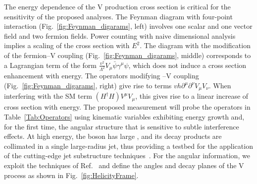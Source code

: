 \documentclass[a4paper,11pt]{article}
\renewcommand{\PV}{{{{V}}}\xspace}
\newcommand{\VH}{{{\PV}{\PH}}\xspace}
\begin{document}
The energy dependence of the \VH production cross section is critical for the sensitivity of the proposed analyses. 
The Feynman diagram with four-point interaction (Fig.~\ref{fig:Feynman_digarams}, left) involves one scalar and one vector field and two fermion fields.
Power counting with naive dimensional analysis~\cite{Manohar:1983md} implies a scaling of the cross section with $E^2$. 
The diagram with the modification of the fermion--\PV coupling (Fig.~\ref{fig:Feynman_digarams}, middle) 
corresponds to a Lagrangian term  of the form $\frac{v^2}{{\Lambda}^2} V_{\mu} \bar{\psi} {{\gamma}^{\mu}} {\psi}$, which does not induce a cross section enhancement with energy. 
The operators modifying \PH--\PV coupling (Fig.~\ref{fig:Feynman_digarams}, right) give rise to terms $vh {\partial}^{\mu}{\partial}^{\nu} V_{\mu}V_{\nu}$.
When interfering with the SM term $(H^{\dagger}H) V^{\mu}V_{\mu}$, this gives rise to a linear increase of cross section with energy.
The proposed measurement will probe the operators in Table~\ref{Tab:Operators} 
using kinematic variables exhibiting energy growth and, for the first time, the angular structure that is sensitive to subtle interference effects.
At high energy, the \PH boson has large \pt, and its decay products are collimated in a single large-radius jet, thus providing a testbed for the application of the cutting-edge jet substructure techniques~\cite{Qu:2019gqs,Sirunyan:2020lcu}.
For the angular information, we exploit the techniques of Ref.~\cite{Banerjee:2019twi} and define the angles and decay planes of the \VH process as shown in Fig.~\ref{fig:HelicityFrame}.
\end{document}
